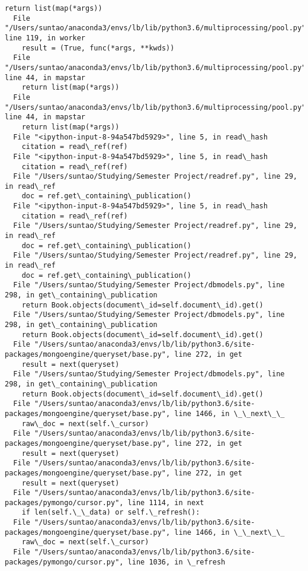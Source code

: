 \documentclass[11pt]{article}
\begin{document}
\begin{Verbatim}[commandchars=\\\{\}]
    return list(map(*args))
  File "/Users/suntao/anaconda3/envs/lb/lib/python3.6/multiprocessing/pool.py", line 119, in worker
    result = (True, func(*args, **kwds))
  File "/Users/suntao/anaconda3/envs/lb/lib/python3.6/multiprocessing/pool.py", line 44, in mapstar
    return list(map(*args))
  File "/Users/suntao/anaconda3/envs/lb/lib/python3.6/multiprocessing/pool.py", line 44, in mapstar
    return list(map(*args))
  File "<ipython-input-8-94a547bd5929>", line 5, in read\_hash
    citation = read\_ref(ref)
  File "<ipython-input-8-94a547bd5929>", line 5, in read\_hash
    citation = read\_ref(ref)
  File "/Users/suntao/Studying/Semester Project/readref.py", line 29, in read\_ref
    doc = ref.get\_containing\_publication()
  File "<ipython-input-8-94a547bd5929>", line 5, in read\_hash
    citation = read\_ref(ref)
  File "/Users/suntao/Studying/Semester Project/readref.py", line 29, in read\_ref
    doc = ref.get\_containing\_publication()
  File "/Users/suntao/Studying/Semester Project/readref.py", line 29, in read\_ref
    doc = ref.get\_containing\_publication()
  File "/Users/suntao/Studying/Semester Project/dbmodels.py", line 298, in get\_containing\_publication
    return Book.objects(document\_id=self.document\_id).get()
  File "/Users/suntao/Studying/Semester Project/dbmodels.py", line 298, in get\_containing\_publication
    return Book.objects(document\_id=self.document\_id).get()
  File "/Users/suntao/anaconda3/envs/lb/lib/python3.6/site-packages/mongoengine/queryset/base.py", line 272, in get
    result = next(queryset)
  File "/Users/suntao/Studying/Semester Project/dbmodels.py", line 298, in get\_containing\_publication
    return Book.objects(document\_id=self.document\_id).get()
  File "/Users/suntao/anaconda3/envs/lb/lib/python3.6/site-packages/mongoengine/queryset/base.py", line 1466, in \_\_next\_\_
    raw\_doc = next(self.\_cursor)
  File "/Users/suntao/anaconda3/envs/lb/lib/python3.6/site-packages/mongoengine/queryset/base.py", line 272, in get
    result = next(queryset)
  File "/Users/suntao/anaconda3/envs/lb/lib/python3.6/site-packages/mongoengine/queryset/base.py", line 272, in get
    result = next(queryset)
  File "/Users/suntao/anaconda3/envs/lb/lib/python3.6/site-packages/pymongo/cursor.py", line 1114, in next
    if len(self.\_\_data) or self.\_refresh():
  File "/Users/suntao/anaconda3/envs/lb/lib/python3.6/site-packages/mongoengine/queryset/base.py", line 1466, in \_\_next\_\_
    raw\_doc = next(self.\_cursor)
  File "/Users/suntao/anaconda3/envs/lb/lib/python3.6/site-packages/pymongo/cursor.py", line 1036, in \_refresh

\end{Verbatim}
\end{document}
